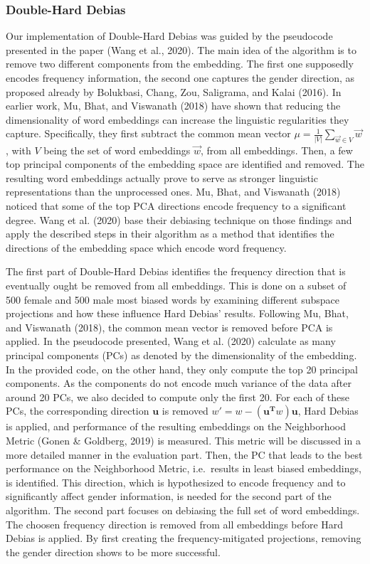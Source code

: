 \documentclass[
  english,
  man,floatsintext]{apa6}
\begin{document}
\hypertarget{double-hard-debias}{%
\subsubsection{Double-Hard Debias}\label{double-hard-debias}}

Our implementation of Double-Hard Debias was guided by the pseudocode presented in the paper (Wang et al., 2020).
The main idea of the algorithm is to remove two different components from the embedding. The first one supposedly encodes frequency information, the second one captures the gender direction, as proposed already by Bolukbasi, Chang, Zou, Saligrama, and Kalai (2016).
In earlier work, Mu, Bhat, and Viswanath (2018) have shown that reducing the dimensionality of word embeddings can increase the linguistic regularities they capture. Specifically, they first subtract the common mean vector \(\mu = \frac{1}{|V|}\sum_{\vec{w} \in V}\vec{w}\), with \(V\) being the set of word embeddings \(\vec{w}\), from all embeddings. Then, a few top principal components of the embedding space are identified and removed. The resulting word embeddings actually prove to serve as stronger linguistic representations than the unprocessed ones. Mu, Bhat, and Viswanath (2018) noticed that some of the top PCA directions encode frequency to a significant degree. Wang et al. (2020) base their debiasing technique on those findings and apply the described steps in their algorithm as a method that identifies the directions of the embedding space which encode word frequency.

The first part of Double-Hard Debias identifies the frequency direction that is eventually ought be removed from all embeddings. This is done on a subset of 500 female and 500 male most biased words by examining different subspace projections and how these influence Hard Debias' results. Following Mu, Bhat, and Viswanath (2018), the common mean vector is removed before PCA is applied. In the pseudocode presented, Wang et al. (2020) calculate as many principal components (PCs) as denoted by the dimensionality of the embedding. In the provided code, on the other hand, they only compute the top 20 principal components. As the components do not encode much variance of the data after around 20 PCs, we also decided to compute only the first 20.
For each of these PCs, the corresponding direction \(\mathbf{u}\) is removed \(w' = w - (\mathbf{u^{T}}w)\mathbf{u}\), Hard Debias is applied, and performance of the resulting embeddings on the Neighborhood Metric (Gonen \& Goldberg, 2019) is measured. This metric will be discussed in a more detailed manner in the evaluation part. Then, the PC that leads to the best performance on the Neighborhood Metric, i.e.~results in least biased embeddings, is identified. This direction, which is hypothesized to encode frequency and to significantly affect gender information, is needed for the second part of the algorithm.
The second part focuses on debiasing the full set of word embeddings. The choosen frequency direction is removed from all embeddings before Hard Debias is applied. By first creating the frequency-mitigated projections, removing the gender direction shows to be more successful.
\end{document}
